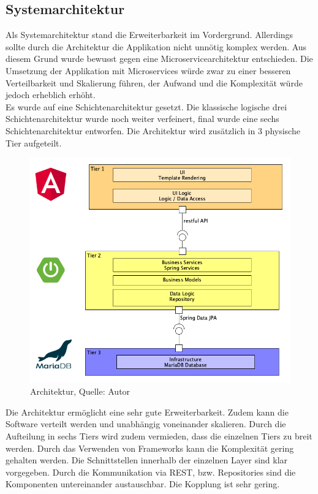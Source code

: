 \subsection{Systemarchitektur}
Als Systemarchitektur stand die Erweiterbarkeit im Vordergrund. Allerdings sollte durch die Architektur die Applikation nicht unnötig komplex werden. Aus diesem Grund wurde bewusst gegen eine Microservicearchitektur entschieden. Die Umsetzung der Applikation mit Microservices würde zwar zu einer besseren Verteilbarkeit und Skalierung führen, der Aufwand und die Komplexität würde jedoch erheblich erhöht. \\
Es wurde auf eine Schichtenarchitektur gesetzt. Die klassische logische drei Schichtenarchitektur wurde noch weiter verfeinert, final wurde eine sechs Schichtenarchitektur entworfen. Die Architektur wird zusätzlich in 3 physische Tier aufgeteilt. 
\begin{figure}[H]
	\centering
	\includegraphics[scale=0.45]{images/architectureWithImages.png}
	\caption[Architektur]{Architektur, Quelle: Autor}
	\label{img: Architektur}
\end{figure}
\newpage
Die Architektur ermöglicht eine sehr gute Erweiterbarkeit. Zudem kann die Software verteilt werden und unabhängig voneinander skalieren. Durch die Aufteilung in sechs Tiers wird zudem vermieden, dass die einzelnen Tiers zu breit werden. Durch das Verwenden von Frameworks kann die Komplexität gering gehalten werden. Die Schnittstellen innerhalb der einzelnen Layer sind klar vorgegeben. Durch die Kommunikation via \ac{REST}, bzw. Repositories sind die Komponenten untereinander austauschbar. Die Kopplung ist sehr gering. 

